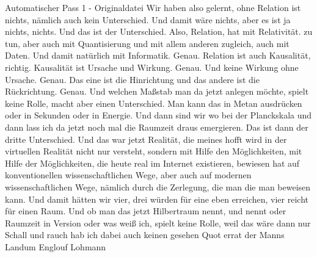 \documentclass[11pt,a4paper]{article}
\begin{document}
\begin{asrbox}{Automatischer Pass 1 - Originaldatei}
Wir haben also gelernt, ohne Relation ist nichts, nämlich auch kein Unterschied. Und damit wäre nichts, aber es ist ja nichts, nichts. Und das ist der Unterschied. Also, Relation, hat mit Relativität. zu tun, aber auch mit Quantisierung und mit allem anderen zugleich, auch mit Daten. Und damit natürlich mit Informatik. Genau. Relation ist auch Kausalität, richtig. Kausalität ist Ursache und Wirkung. Genau. Und keine Wirkung ohne Ursache. Genau. Das eine ist die Hinrichtung und das andere ist die Rückrichtung. Genau. Und welchen Maßstab man da jetzt anlegen möchte, spielt keine Rolle, macht aber einen Unterschied. Man kann das in Metan ausdrücken oder in Sekunden oder in Energie. Und dann sind wir wo bei der Planckskala und dann lass ich da jetzt noch mal die Raumzeit draus emergieren. Das ist dann der dritte Unterschied. Und das war jetzt Realität, die meines hofft wird in der virtuellen Realität nicht nur versteht, sondern mit Hilfe den Möglichkeiten, mit Hilfe der Möglichkeiten, die heute real im Internet existieren, bewiesen hat auf konventionellen wissenschaftlichen Wege, aber auch auf modernen wissenschaftlichen Wege, nämlich durch die Zerlegung, die man die man beweisen kann. Und damit hätten wir vier, drei würden für eine eben erreichen, vier reicht für einen Raum. Und ob man das jetzt Hilbertraum nennt, und nennt oder Raumzeit in Version oder was weiß ich, spielt keine Rolle, weil das wäre dann nur Schall und rauch hab ich dabei auch keinen gesehen Quot errat der Manns Landum Englouf Lohmann
\end{asrbox}
\end{document}
